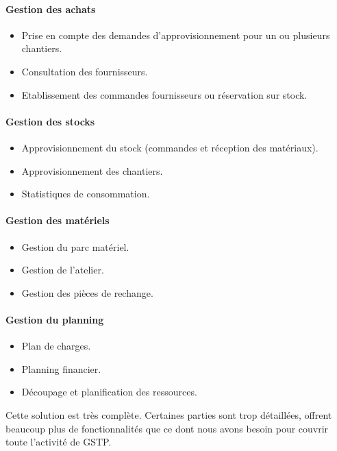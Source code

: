 				\paragraph{Gestion des achats}
				\begin{itemize}
				    \item Prise en compte des demandes d'approvisionnement pour un ou plusieurs chantiers.
				    \item Consultation des fournisseurs.
				    \item Etablissement des commandes fournisseurs ou réservation sur stock.
				\end{itemize}
				
				\paragraph{Gestion des stocks}
				\begin{itemize}
				    \item Approvisionnement du stock (commandes et réception des matériaux).
				    \item Approvisionnement des chantiers.
				    \item Statistiques de consommation.
				\end{itemize}
				
				\paragraph{Gestion des matériels}
				\begin{itemize}
				    \item Gestion du parc matériel.
				    \item Gestion de l'atelier.
				    \item Gestion des pièces de rechange.
				\end{itemize}
				
				\paragraph{Gestion du planning}
				\begin{itemize}
				    \item Plan de charges.
				    \item Planning financier.
				    \item Découpage et planification des ressources.
				\end{itemize}
				
		Cette solution est très complète. Certaines parties sont trop détaillées, offrent beaucoup plus de fonctionnalités que ce dont nous avons besoin pour couvrir toute l'activité de GSTP.
			
